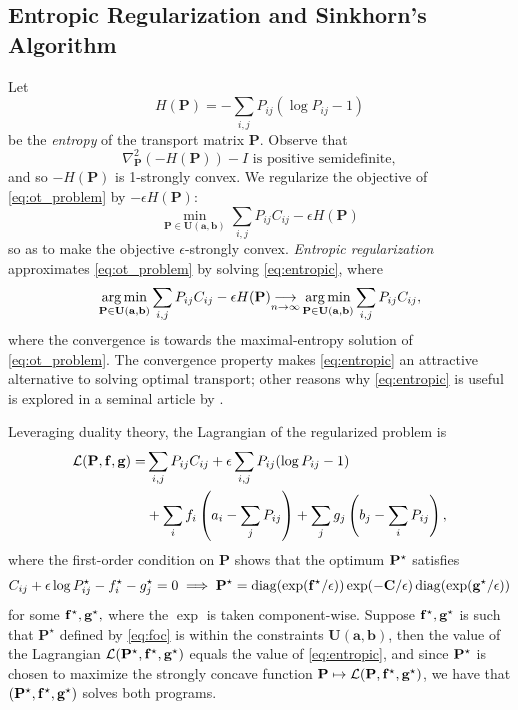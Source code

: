 \documentclass{article}
\renewcommand{\b}{\mathbf}
\theoremstyle{definition}
\theoremstyle{remark}
\newcommand{\feasible}{\b U(\b a, \b b)}
\begin{document}
\subsection{Entropic Regularization and Sinkhorn's Algorithm} %
\label{sub:entropic_regularization_and_sinkhorn_s_algorithm}

Let \[H(\b P)= -\sum_{i,j} P_{ij}(\log P_{ij} - 1)\] be the \emph{entropy} of
 the transport matrix $\b P$. Observe that \[
\nabla^2_{\b P} (-H(\b P)) - I \text{ is positive semidefinite},
\]
and so $-H(\b P)$ is 1-strongly convex. We regularize the objective of 
\eqref{eq:ot_problem} by $-\epsilon H(\b P):$ \begin{equation}
\label{eq:entropic}
  \min_{\b P \in \feasible} \sum_{i,j}P_{ij}C_{ij} - \epsilon H(\b P) 
\tag{Entropic Regularization}
\end{equation}
so as to make the objective $\epsilon$-strongly convex. \emph{Entropic
 regularization} approximates \eqref{eq:ot_problem} by solving 
\eqref{eq:entropic}, where \[
\argmin_{\b P \in \feasible} \sum_{i,j}P_{ij}C_{ij} - \epsilon H(\b P) 
 {\underset{n\to\infty}{\longrightarrow}}
 \argmin_{\b P \in \feasible} \sum_{i,j}P_{ij}C_{ij},
\]
where the convergence is towards the maximal-entropy solution of 
\eqref{eq:ot_problem}. The convergence property makes \eqref{eq:entropic} an
 attractive alternative to solving optimal transport; other reasons why 
\eqref{eq:entropic} is useful is explored in a seminal article by 
\cite{cuturi2013sinkhorn}. 

Leveraging duality theory, the Lagrangian of the regularized problem is 
\begin{align*}
\mathcal L(\b P, \b f, \b g) = & \sum_{i,j} P_{ij}C_{ij} + \epsilon \sum_
{i,j} P_{ij}
(\log
 P_{ij} - 1) \\ 
& + \sum_i f_i\pr{a_i - \sum_{j}P_{ij}} + \sum_j g_j \pr{b_j - \sum_i P_{ij}},
\end{align*}
where the first-order condition on $\b P$ shows that the optimum $\b P^\*$
 satisfies 
\begin{equation}
\label{eq:foc}
  C_{ij} + \epsilon \log P_{ij}^\* - f_i^\star - g_j^\* = 0 \implies \b P^\* =
 \diag(\exp(\b f^\* / \epsilon)) \exp(-\b C/\epsilon )\diag(\exp(\b g^\* /
 \epsilon))
\end{equation}
for some $\b f^\star, \b g^\*,$ where the $\exp$ is taken component-wise.
 Suppose $\b f^\star, \b g^\*$ is such that $\b P^\star$ defined by 
\eqref{eq:foc} is within the constraints $\feasible$, then the value of the
 Lagrangian $\mathcal L(\b P^\*, \b f^\*, \b g^\*)$ equals the value of 
\eqref{eq:entropic}, and since  $\b P^\*$ is chosen to maximize the strongly
 concave function $\b P \mapsto \mathcal L(\b P, \b f^\*, \b g^\*)$, we have
 that $(\b P^\*, \b f^\*, \b g^\*)$ solves both programs. 
\end{document}
